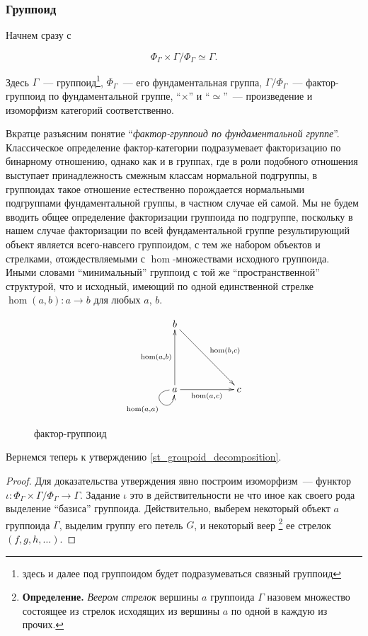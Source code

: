 \subsubsection{Группоид}
    Начнем сразу с
    \begin{statement}\label{st_groupoid_decomposition}
        \[\textstyle{\Phi_\Gamma \times \Gamma / \Phi_\Gamma \simeq \Gamma}.\]
    \end{statement}
    Здесь $\Gamma$~--- группоид\footnote{здесь и далее под группоидом будет 
    подразумеваться связный группоид}, $\Phi_\Gamma$~--- его фундаментальная 
    группа, $\Gamma / \Phi_\Gamma$~--- фактор-группоид по фундаментальной 
    группе, ``$\times$'' и ``$\simeq$''~--- произведение и изоморфизм категорий 
    соответственно.

    Вкратце разъясним понятие ``\emph{фактор-группоид по фундаментальной группе}''. 
    Классическое определение фактор-категории\cite{MacLane} подразумевает 
    факторизацию по бинарному отношению, однако как и в группах, где в роли 
    подобного отношения выступает принадлежность смежным классам нормальной 
    подгруппы, в группоидах такое отношение естественно порождается нормальными 
    подгруппами фундаментальной группы, в частном случае ей самой. Мы не будем 
    вводить общее определение факторизации группоида по подгруппе, поскольку в 
    нашем случае факторизации по всей фундаментальной группе результирующий 
    объект является всего-навсего группоидом, с тем же набором 
    объектов и стрелками, отождествляемыми с $\hom$-множествами исходного 
    группоида. Иными словами ``минимальный'' группоид с той же 
    ``пространственной'' структурой, что и исходный, имеющий по одной 
    единственной стрелке $\hom(a,b) : a \to b$ для любых $a$, $b$.

    \begin{figure}[h]
        \centering
        \[\xymatrix{
            b \ar[ddrr]^{\hom(b,c)}                                           & &     \\
                                                                                                & &     \\
            a \ar@(l,d)[]_{\hom(a,a)} \ar[uu]^{\hom(a,b)} \ar[rr]_{\hom(a,c)}   & & c
        }\]
        \caption{фактор-группоид}
        \label{cd_factor_groupoid}
    \end{figure}

    Вернемся теперь к утверждению \ref{st_groupoid_decomposition}.
    \begin{proof}
        Для доказательства утверждения явно построим изоморфизм~--- функтор 
        $\iota : \Phi_\Gamma \times \Gamma / \Phi_\Gamma \to \Gamma$. Задание 
        $\iota$ это в действительности не что иное как своего рода выделение 
        ``базиса'' группоида. Действительно, выберем некоторый объект $a$ 
        группоида $\Gamma$, выделим группу его петель $G$, и некоторый веер
        \footnote{\textbf{Определение.} \emph{Веером стрелок} вершины 
        $a$ группоида $\Gamma$ назовем множество состоящее из стрелок исходящих 
        из вершины $a$ по одной в каждую из прочих.} ее стрелок $(f, g, h, \ldots)$.
    \end{proof}

